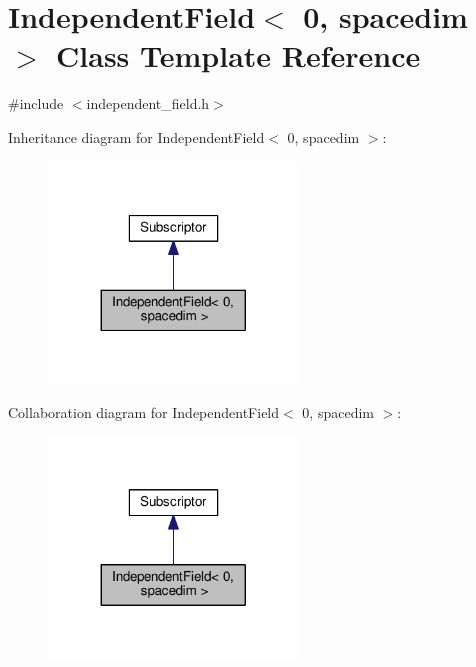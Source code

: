 \hypertarget{class_independent_field_3_010_00_01spacedim_01_4}{}\section{Independent\+Field$<$ 0, spacedim $>$ Class Template Reference}
\label{class_independent_field_3_010_00_01spacedim_01_4}


{\ttfamily \#include $<$independent\+\_\+field.\+h$>$}



Inheritance diagram for Independent\+Field$<$ 0, spacedim $>$\+:
\nopagebreak
\begin{figure}[H]
\begin{center}
\leavevmode
\includegraphics[width=188pt]{class_independent_field_3_010_00_01spacedim_01_4__inherit__graph}
\end{center}
\end{figure}


Collaboration diagram for Independent\+Field$<$ 0, spacedim $>$\+:
\nopagebreak
\begin{figure}[H]
\begin{center}
\leavevmode
\includegraphics[width=188pt]{class_independent_field_3_010_00_01spacedim_01_4__coll__graph}
\end{center}
\end{figure}
